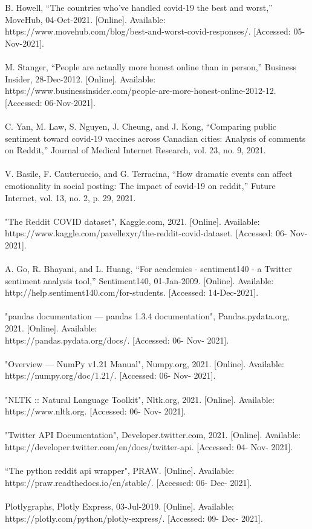 \documentclass[fontsize=11pt]{article}
\begin{document}
\text{[1]} B. Howell, “The countries who've handled covid-19 the best and worst,” MoveHub, 04-Oct-2021. [Online]. Available: https://www.movehub.com/blog/best-and-worst-covid-responses/. [Accessed: 05-Nov-2021]. 
\\\\
\text{[2]} M. Stanger, “People are actually more honest online than in person,” Business Insider, 28-Dec-2012. [Online]. Available: https://www.businessinsider.com/people-are-more-honest-online-2012-12. [Accessed: 06-Nov-2021]. 
\\\\
\text{[3]} C. Yan, M. Law, S. Nguyen, J. Cheung, and J. Kong, “Comparing public sentiment toward covid-19 vaccines across Canadian cities: Analysis of comments on Reddit,” Journal of Medical Internet Research, vol. 23, no. 9, 2021. 
\\\\
\text{[4]} V. Basile, F. Cauteruccio, and G. Terracina, “How dramatic events can affect emotionality in social posting: The impact of covid-19 on reddit,” Future Internet, vol. 13, no. 2, p. 29, 2021.
\\\\
\text{[5]} "The Reddit COVID dataset", Kaggle.com, 2021. [Online]. Available: https://www.kaggle.com/pavellexyr/the-reddit-covid-dataset. [Accessed: 06- Nov- 2021].
\\\\
\text{[6]} A. Go, R. Bhayani, and L. Huang, “For academics - sentiment140 - a Twitter sentiment analysis tool,” Sentiment140, 01-Jan-2009. [Online]. Available: http://help.sentiment140.com/for-students. [Accessed: 14-Dec-2021]. 
\\\\
\text{[7]} "pandas documentation — pandas 1.3.4 documentation", Pandas.pydata.org, 2021. [Online]. Available: \\ https://pandas.pydata.org/docs/. [Accessed: 06- Nov- 2021].
\\\\
\text{[8]} "Overview — NumPy v1.21 Manual", Numpy.org, 2021. [Online]. Available: https://numpy.org/doc/1.21/. [Accessed: 06- Nov- 2021].
\\\\
\text{[9]} "NLTK :: Natural Language Toolkit", Nltk.org, 2021. [Online]. Available: https://www.nltk.org. [Accessed: 06- Nov- 2021].
\\\\
\text{[10]} "Twitter API Documentation", Developer.twitter.com, 2021. [Online]. Available: \\ https://developer.twitter.com/en/docs/twitter-api. [Accessed: 04- Nov- 2021].
\\\\
\text{[11]} “The python reddit api wrapper", PRAW. [Online]. Available: \\ https://praw.readthedocs.io/en/stable/. [Accessed: 06- Dec- 2021].
\\\\
\text{[12]} Plotlygraphs, Plotly Express, 03-Jul-2019. [Online]. Available: \\ https://plotly.com/python/plotly-express/. [Accessed: 09- Dec- 2021].
\end{document}
